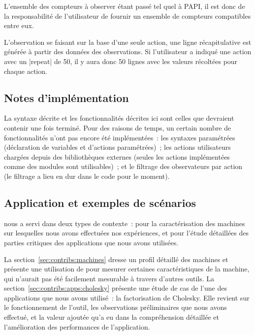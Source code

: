 L'ensemble des compteurs à observer étant passé tel quel à PAPI, il est donc de la responsabilité de l'utilisateur de fournir un ensemble de compteurs compatibles entre eux.

L'observation se faisant sur la base d'une seule action, une ligne récapitulative est générée à partir des données des observations.
Si l'utilisateur a indiqué une action avec un |repeat| de 50, il y aura donc 50 lignes avec les valeurs récoltées pour chaque action.

\subsection{Notes d'implémentation}

La syntaxe décrite et les fonctionnalités décrites ici sont celles que devraient contenir \outil une fois terminé.
Pour des raisons de temps, un certain nombre de fonctionnalités n'ont pas encore été implémentées~: les syntaxes paramétrées (déclaration de variables et d'actions paramétrées)~; les actions utilisateurs chargées depuis des bibliothèques externes (seules les actions implémentées comme des modules sont utilisables)~; et le filtrage des observateurs par action (le filtrage a lieu en dur dans le code pour le moment).

\subsection{Application et exemples de scénarios}

\outil nous a servi dans deux types de contexte~: pour la caractérisation des machines sur lesquelles nous avons effectuées nos expériences, et pour l'étude détaillées des parties critiques des applications que nous avons utilisées.

La section~\ref{sec:contribs:machines} dresse un profil détaillé des machines et présente une utilisation de \outil pour mesurer certaines caractéristiques de la machine, qui n'aurait pas été facilement mesurable à travers d'autres outils.
La section~\ref{sec:contribs:apps:cholesky} présente une étude de cas de l'une des applications que nous avons utilisé~: la factorisation de Cholesky.
Elle revient sur le fonctionnement de l'outil, les observations préliminaires que nous avons effectué, et la valeur ajoutée qu'a eu \outil dans la compréhension détaillée et l'amélioration des performances de l'application.



